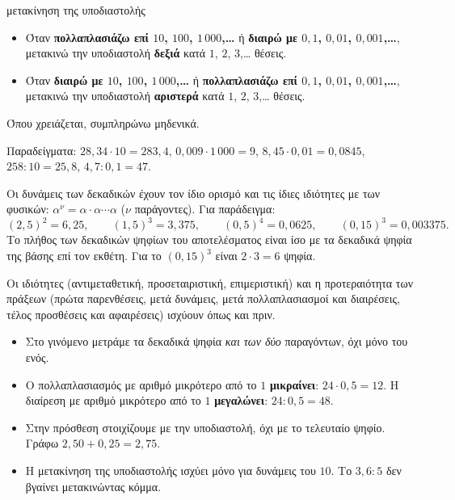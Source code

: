 
\begin{kanonas}{μετακίνηση της υποδιαστολής}
\begin{itemize}[leftmargin=1.2em,itemsep=0.3ex,topsep=2pt]
\item Όταν \textbf{πολλαπλασιάζω επί $10$, $100$, $1\,000$,\dots} ή \textbf{διαιρώ με $0{,}1$, $0{,}01$, $0{,}001$,\dots}, μετακινώ την υποδιαστολή \textbf{δεξιά} κατά $1$, $2$, $3$,\dots{} θέσεις.
\item Όταν \textbf{διαιρώ με $10$, $100$, $1\,000$,\dots} ή \textbf{πολλαπλασιάζω επί $0{,}1$, $0{,}01$, $0{,}001$,\dots}, μετακινώ την υποδιαστολή \textbf{αριστερά} κατά $1$, $2$, $3$,\dots{} θέσεις.
\end{itemize}
Όπου χρειάζεται, συμπληρώνω μηδενικά.
\end{kanonas}

Παραδείγματα: $28{,}34\cdot10=283{,}4$, $0{,}009\cdot1\,000=9$, $8{,}45\cdot0{,}01=0{,}0845$, $258:10=25{,}8$, $4{,}7:0{,}1=47$.


Οι δυνάμεις των δεκαδικών έχουν τον ίδιο ορισμό και τις ίδιες ιδιότητες με των φυσικών: $\alpha^\nu=\alpha\cdot\alpha\cdots\alpha$ ($\nu$ παράγοντες). Για παράδειγμα:
$$(2{,}5)^2=6{,}25,\qquad (1{,}5)^3=3{,}375,\qquad (0{,}5)^4=0{,}0625,\qquad (0{,}15)^3=0{,}003375.$$
Το πλήθος των δεκαδικών ψηφίων του αποτελέσματος είναι ίσο με τα δεκαδικά ψηφία της βάσης επί τον εκθέτη. Για το $(0{,}15)^3$ είναι $2\cdot3=6$ ψηφία.

Οι ιδιότητες (αντιμεταθετική, προσεταιριστική, επιμεριστική) και η προτεραιότητα των πράξεων (πρώτα παρενθέσεις, μετά δυνάμεις, μετά πολλαπλασιασμοί και διαιρέσεις, τέλος προσθέσεις και αφαιρέσεις) ισχύουν όπως και πριν.

\begin{prosoxi}
\begin{itemize}[leftmargin=1.2em,itemsep=0.3ex,topsep=2pt]
\item Στο γινόμενο μετράμε τα δεκαδικά ψηφία \emph{και των δύο} παραγόντων, όχι μόνο του ενός.
\item Ο πολλαπλασιασμός με αριθμό μικρότερο από το $1$ \textbf{μικραίνει}: $24\cdot0{,}5=12$. Η διαίρεση με αριθμό μικρότερο από το $1$ \textbf{μεγαλώνει}: $24:0{,}5=48$.
\item Στην πρόσθεση στοιχίζουμε με την υποδιαστολή, όχι με το τελευταίο ψηφίο. Γράφω $2{,}50+0{,}25=2{,}75$.
\item Η μετακίνηση της υποδιαστολής ισχύει μόνο για δυνάμεις του $10$. Το $3{,}6:5$ δεν βγαίνει μετακινώντας κόμμα.
\end{itemize}
\end{prosoxi}

